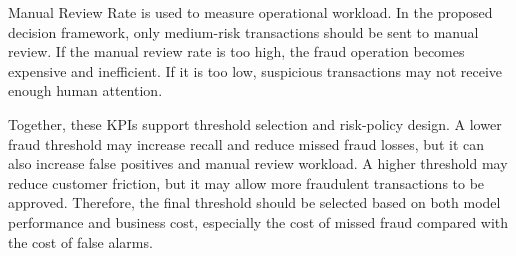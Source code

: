 Manual Review Rate is used to measure operational workload. In the proposed decision framework, only medium-risk transactions should be sent to manual review. If the manual review rate is too high, the fraud operation becomes expensive and inefficient. If it is too low, suspicious transactions may not receive enough human attention.

Together, these KPIs support threshold selection and risk-policy design. A lower fraud threshold may increase recall and reduce missed fraud losses, but it can also increase false positives and manual review workload. A higher threshold may reduce customer friction, but it may allow more fraudulent transactions to be approved. Therefore, the final threshold should be selected based on both model performance and business cost, especially the cost of missed fraud compared with the cost of false alarms.

